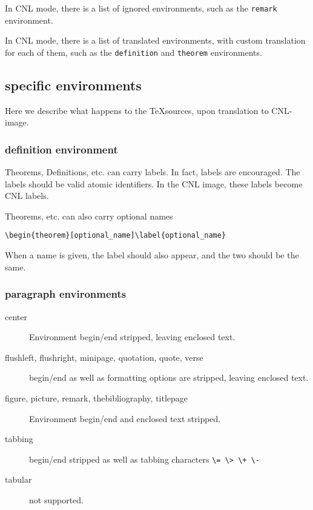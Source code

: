\documentclass[12pt]{amsart}
\newtheorem{theorem}[definition]{Theorem}
\begin{document}
In CNL mode, there is a list of ignored environments, such as the
\verb!remark! environment.

In CNL mode, there is a list of translated environments, with custom
translation for each of them, such as the \verb!definition!  and
\verb!theorem! environments.


\subsection{specific environments}

Here we describe what happens to the \TeX sources, 
upon translation to CNL-image.


\subsubsection{definition environment}

Theorems, Definitions, etc. can carry labels.  In fact, labels are
encouraged.  The labels should be valid atomic identifiers.  In the
CNL image, these labels become CNL labels.

Theorems, etc. can also carry optional names

\verb!\begin{theorem}[optional_name]\label{optional_name}!

When a name is given, the label should also appear, and the two should
be the same.


\subsubsection{paragraph environments}

\begin{description}
\item [center] Environment begin/end stripped, leaving enclosed text.
\item [flushleft, flushright, minipage, quotation, quote, verse]  begin/end as well as formatting options are stripped, leaving enclosed text.
\item [figure, picture, remark, thebibliography, titlepage] Environment begin/end and enclosed text stripped.
\item [tabbing]  begin/end stripped as well as tabbing characters \verb!\= \> \+ \-!
\item [tabular] not supported.
\end{description}
\end{document}
